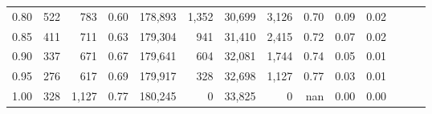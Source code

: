 \begin{tabular}{rrrrrrrrrrrrrr}
0.80 &     522 &    783 &  0.60 &  178,893 &    1,352 &  30,699 &   3,126 &  0.70 &  0.09 &      0.02 \\
0.85 &     411 &    711 &  0.63 &  179,304 &      941 &  31,410 &   2,415 &  0.72 &  0.07 &      0.02 \\
0.90 &     337 &    671 &  0.67 &  179,641 &      604 &  32,081 &   1,744 &  0.74 &  0.05 &      0.01 \\
0.95 &     276 &    617 &  0.69 &  179,917 &      328 &  32,698 &   1,127 &  0.77 &  0.03 &      0.01 \\
1.00 &     328 &  1,127 &  0.77 &  180,245 &        0 &  33,825 &       0 &   nan &  0.00 &      0.00 \\
\bottomrule
\end{tabular}
